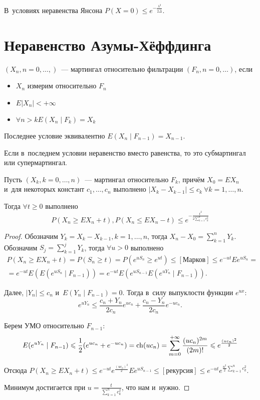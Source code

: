\documentclass{article}
\begin{document}
\begin{corollary}
	В~условиях неравенства Янсона $P(X = 0) \le e^{-\frac{\lambda^2}{2\overline{\Delta}}}$.
\end{corollary}

\section{Неравенство Азумы-Хёффдинга}

\begin{definition}
	$(X_n, n=0,\ldots,)$~--- мартингал относительно фильтрации $(F_n, n=0,\ldots)$, если
	\begin{itemize}
		\item $X_n$ измерим относительно $F_n$
		\item $E|X_n| < +\infty$
		\item $\forall n > k E(X_n \mid F_k) = X_k$
	\end{itemize}
\end{definition}

\begin{exercise}
	Последнее условие эквивалентно $E(X_n \mid F_{n-1}) = X_{n-1}$.
\end{exercise}

Если в~последнем условии неравенство вместо равенства, то это субмартингал или супермартингал.

\begin{theorem}
	Пусть $(X_k,k=0,\ldots,n)$~--- мартингал относительно $F_k$, причём $X_0 = EX_n$ и~для некоторых
	констант $c_1, \ldots, c_n$ выполнено $|X_k - X_{k-1}| \le c_k\ \forall k=1,\ldots,n$.

	Тогда $\forall t \ge 0$ выполнено
	$$P(X_n \ge EX_n + t), P(X_n \le EX_n - t) \le e^{-\frac{t^2}{2\sum\limits_{k=1}^n c_k^2}}$$
\end{theorem}
\begin{proof}
	Обозначим $Y_k = X_k - X_{k-1}, k = 1, \ldots, n$, тогда $X_n - X_0 = \sum\limits_{k=1}^n Y_k$.
	Обозначим $S_j = \sum\limits_{k=1}^j Y_k$, тогда $\forall u > 0$ выполнено
	\begin{multline*}
		P(X_n \ge EX_n + t) = P(S_n \ge t) = P(e^{uS_n} \ge e^{ut}) \le [\text{Марков}] \le e^{-ut}
		Ee^{uS_n} =\\= e^{-ut}E(E(e^{uS_n}\mid F_{n-1})) = e^{-ut} E(e^{uS_{n-1}}E(e^{uY_n}\mid
		F_{n-1})).
	\end{multline*}

	Далее, $|Y_n| \le c_n$ и~$E(Y_n \mid F_{n-1}) = 0$. Тогда в~силу выпуклости функции $e^{ux}$:
	$$e^{uY_n} \le \frac{c_n + Y_n}{2c_n} e^{uc_n} + \frac{c_n - Y_n}{2c_n} e^{-uc_n}.$$

	Берем УМО относительно $F_{n-1}$:
	$$
		E(e^{uY_n} \mid F_{n-1}) \leqslant \frac{1}{2}(e^{uc_n} + e^{-uc_n}) = \operatorname{ch}(uc_n) =
		\sum\limits_{m=0}^{+\infty} \frac{(uc_n)^{2m}}{(2m)!} \leqslant e^{\frac{(uc_n)^2}{2}}
	$$

	Отсюда $P(X_n \ge EX_n + t) \le e^{-ut} e^\frac{(uc_n)^2}{2} Ee^{uS_{n-1}} \le [\text{рекурсия}]
	\le e^{-ut} e^{\frac{u^2}{2} \sum\limits_{k=1}^n c_k^2}$.

	Минимум достигается при $u = \frac{t}{\sum\limits_{k=1}^n c_k^2}$, что нам и~нужно.
\end{proof}
\end{document}
